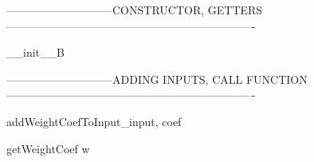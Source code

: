 -----------------------------CONSTRUCTOR, GETTERS-------------------------------------------------------------------

\begin{method}{\_\_init\_\_}{B}

\end{method}

-----------------------------ADDING INPUTS, CALL FUNCTION-------------------------------------------------------------------
\begin{method}{addWeightCoefToInput}{\_input, coef}

\end{method}

\begin{method}{getWeightCoef}{ w}

\end{method}





